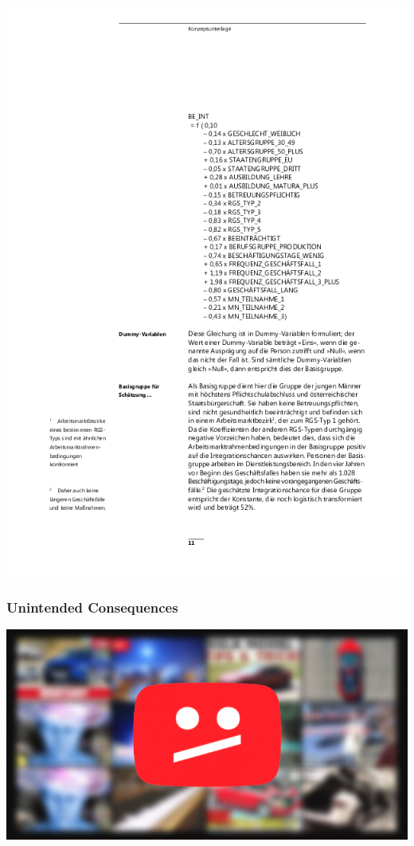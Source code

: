 \documentclass[aspectratio=169,xcolor=dvipsnames]{beamer}
\begin{document}
\begin{frame}
\begin{center}
\includegraphics[height=0.7\paperheight,keepaspectratio]{images/negativfaktor} 
\end{center}
\end{frame}

\begin{frame}
\frametitle{Unintended Consequences}
\begin{center}
\includegraphics[height=0.7\paperheight,keepaspectratio]{images/youtube} 
\end{center}
\end{frame}
\end{document}
